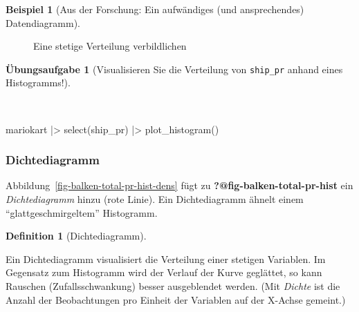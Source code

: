 \documentclass[
  a4paper,
]{scrbook}
\newenvironment{Shaded}{\begin{snugshade}}{\end{snugshade}}
\newcommand{\FunctionTok}[1]{\textcolor[rgb]{0.28,0.35,0.67}{#1}}
\newcommand{\NormalTok}[1]{\textcolor[rgb]{0.00,0.23,0.31}{#1}}
\newcommand{\SpecialCharTok}[1]{\textcolor[rgb]{0.37,0.37,0.37}{#1}}
\theoremstyle{definition}
\newtheorem{example}{Beispiel}[chapter]
\theoremstyle{definition}
\newtheorem{definition}{Definition}[chapter]
\theoremstyle{definition}
\newtheorem{exercise}{Übungsaufgabe}[chapter]
\theoremstyle{remark}
\begin{document}
\begin{example}[Aus der Forschung: Ein aufwändiges (und ansprechendes)
Datendiagramm]
\begin{figure}
\begin{minipage}{0.50\linewidth}
\end{minipage}%

\caption{\label{fig-de-hist-density}Eine stetige Verteilung
verbildlichen}

\end{figure}%

\begin{exercise}[Visualisieren Sie die Verteilung von \texttt{ship\_pr}
anhand eines
Histogramms!]\protect\hypertarget{exr-histo-ship-pr}{}\label{exr-histo-ship-pr}

~

\begin{Shaded}
\begin{Highlighting}[]
\NormalTok{mariokart }\SpecialCharTok{|\textgreater{}} 
  \FunctionTok{select}\NormalTok{(ship\_pr) }\SpecialCharTok{|\textgreater{}} 
  \FunctionTok{plot\_histogram}\NormalTok{()}
\end{Highlighting}
\end{Shaded}

\end{exercise}

\subsubsection{Dichtediagramm}\label{dichtediagramm}

Abbildung~\ref{fig-balken-total-pr-hist-dens} fügt zu
\textbf{?@fig-balken-total-pr-hist} ein \emph{Dichtediagramm} hinzu
(rote Linie). Ein Dichtediagramm ähnelt einem ``glattgeschmirgeltem''
Histogramm.

\begin{definition}[Dichtediagramm]\protect\hypertarget{def-dichtediagramm}{}\label{def-dichtediagramm}

Ein Dichtediagramm visualisiert die Verteilung einer stetigen Variablen.
Im Gegensatz zum Histogramm wird der Verlauf der Kurve geglättet, so
kann Rauschen (Zufallsschwankung) besser ausgeblendet werden. (Mit
\emph{Dichte} ist die Anzahl der Beobachtungen pro Einheit der Variablen
auf der X-Achse gemeint.)

\end{definition}

\begin{figure}

\end{figure}
\end{example}
\end{document}
